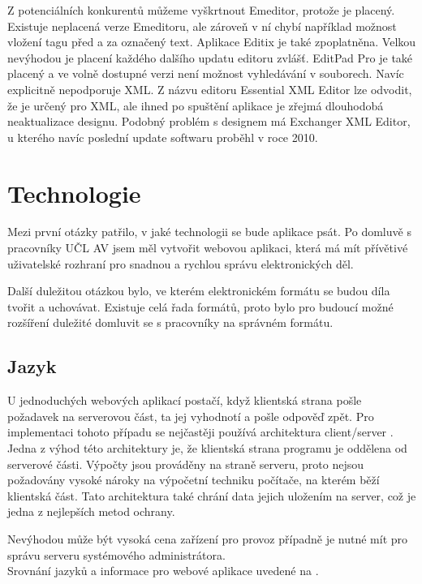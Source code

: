             Z potenciálních konkurentů můžeme vyškrtnout Emeditor, protože je placený. Existuje neplacená verze Emeditoru, ale zároveň v ní chybí například možnost vložení tagu před a za označený text. Aplikace Editix je také zpoplatněna. Velkou nevýhodou je placení každého dalšího updatu editoru zvlášť. EditPad Pro je také placený a ve volně dostupné verzi není možnost vyhledávání v souborech. Navíc explicitně nepodporuje XML. Z názvu editoru Essential XML Editor lze odvodit, že je určený pro XML, ale ihned po spuštění aplikace je zřejmá dlouhodobá neaktualizace designu. Podobný problém s designem má Exchanger XML Editor, u kterého navíc poslední update softwaru proběhl v roce 2010.
        
            
    \section{Technologie}
        Mezi první otázky patřilo, v jaké technologii se bude aplikace psát. Po domluvě s pracovníky UČL AV jsem měl vytvořit webovou aplikaci, která má mít přívětivé uživatelské rozhraní pro snadnou a rychlou správu elektronických děl.
        
        Další duležitou otázkou bylo, ve kterém elektronickém formátu se budou díla tvořit a uchovávat. Existuje celá řada formátů, proto bylo pro budoucí možné rozšíření duležité domluvit se s pracovníky na správném formátu.
        
        \subsection{Jazyk}
            U jednoduchých webových aplikací postačí, když klientská strana pošle požadavek na serverovou část, ta jej vyhodnotí a pošle odpověď zpět. Pro implementaci tohoto případu se nejčastěji používá architektura client/server \cite{languages}. 
            Jedna z výhod této architektury je, že klientská strana programu je oddělena od serverové části. Výpočty jsou prováděny na straně serveru, proto nejsou požadovány vysoké nároky na výpočetní techniku počítače, na kterém běží klientská část. Tato architektura také chrání data jejich uložením na server, což je jedna z nejlepších metod ochrany.
            
            Nevýhodou může být vysoká cena zařízení pro provoz případně je nutné mít pro správu serveru systémového administrátora.\\
            Srovnání jazyků a informace pro webové aplikace uvedené na \cite{languages}.
            
